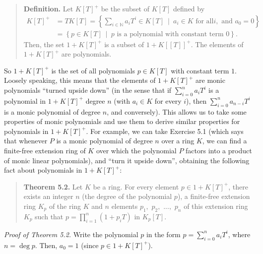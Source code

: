 \documentclass[numbers=enddot,12pt,final,onecolumn,notitlepage]{scrartcl}%
\begin{document}
\begin{quote}
\textbf{Definition.} Let $K\left[  T\right]  ^{+}$ be the subset of $K\left[
T\right]  $ defined by%
\begin{align*}
K\left[  T\right]  ^{+}  &  =TK\left[  T\right]  =\left\{  \sum_{i\in
\mathbb{N}}a_{i}T^{i}\in K\left[  T\right]  \ \mid\ a_{i}\in K\text{ for all
}i,\text{ and }a_{0}=0\right\} \\
&  =\left\{  p\in K\left[  T\right]  \ \mid\ p\text{ is a polynomial with
constant term }0\right\}  .
\end{align*}
Then, the set $1+K\left[  T\right]  ^{+}$ is a subset of $1+K\left[  \left[
T\right]  \right]  ^{+}.$ The elements of $1+K\left[  T\right]  ^{+}$ are polynomials.
\end{quote}

So $1+K\left[  T\right]  ^{+}$ is the set of all polynomials $p\in K\left[
T\right]  $ with constant term $1$. Loosely speaking, this means that the
elements of $1+K\left[  T\right]  ^{+}$ are monic polynomials ``turned upside
down'' (in the sense that if $\sum\limits_{i=0}^{n}a_{i}T^{i}$ is a polynomial
in $1+K\left[  T\right]  ^{+}$ degree $n$ (with $a_{i}\in K$ for every $i$),
then $\sum\limits_{i=0}^{n}a_{n-i}T^{i}$ is a monic polynomial of degree $n$,
and conversely). This allows us to take some properties of monic polynomials
and use them to derive similar properties for polynomials in $1+K\left[
T\right]  ^{+}$. For example, we can take Exercise 5.1 (which says that
whenever $P$ is a monic polynomial of degree $n$ over a ring $K$, we can find
a finite-free extension ring of $K$ over which the polynomial $P$ factors into
a product of monic linear polynomials), and ``turn it upside down'', obtaining
the following fact about polynomials in $1+K\left[  T\right]  ^{+}$:

\begin{quote}
\textbf{Theorem 5.2.} Let $K$ be a ring. For every element $p\in1+K\left[
T\right]  ^{+}$, there exists an integer $n$ (the degree of the polynomial
$p$), a finite-free extension ring $K_{p}$ of the ring $K$ and $n$ elements
$p_{1},$ $p_{2},$ $...,$ $p_{n}$ of this extension ring $K_{p}$ such that
$p=\prod\limits_{i=1}^{n}\left(  1+p_{i}T\right)  $ in $K_{p}\left[  T\right]
$.
\end{quote}

\textit{Proof of Theorem 5.2.} Write the polynomial $p$ in the form
$p=\sum\limits_{i=0}^{n}a_{i}T^{i}$, where $n=\deg p$. Then, $a_{0}=1$ (since
$p\in1+K\left[  T\right]  ^{+}$).
\end{document}
